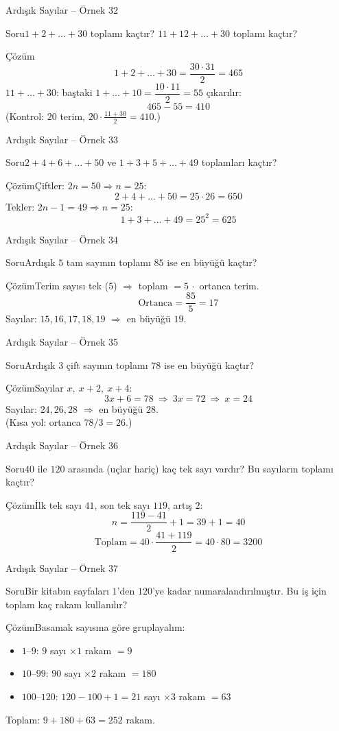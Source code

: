 \documentclass[aspectratio=169,11pt]{beamer}
\newcommand{\soru}[3]{%
\begin{frame}{#1}
  \begin{block}{Soru}\large #2\end{block}
  \pause
  \begin{exampleblock}{Çözüm}\large #3\end{exampleblock}
\end{frame}}
\begin{document}
\soru{Ardışık Sayılar -- Örnek 32}
{\(1+2+\dots+30\) toplamı kaçtır? \(11+12+\dots+30\) toplamı kaçtır?}
{\[1+2+\dots+30=\frac{30\cdot 31}{2}=465\]
\(11+\dots+30\): baştaki \(1+\dots+10=\dfrac{10\cdot 11}{2}=55\) çıkarılır:
\[465-55=410\]
(Kontrol: \(20\) terim, \(20\cdot\frac{11+30}{2}=410\).)}

\soru{Ardışık Sayılar -- Örnek 33}
{\(2+4+6+\dots+50\) ve \(1+3+5+\dots+49\) toplamları kaçtır?}
{Çiftler: \(2n=50\Rightarrow n=25\):
\[2+4+\dots+50=25\cdot 26=650\]
Tekler: \(2n-1=49\Rightarrow n=25\):
\[1+3+\dots+49=25^2=625\]}

\soru{Ardışık Sayılar -- Örnek 34}
{Ardışık \(5\) tam sayının toplamı \(85\) ise en büyüğü kaçtır?}
{Terim sayısı tek (\(5\)) \(\Rightarrow\) toplam \(=5\,\cdot\) ortanca terim.
\[\text{Ortanca}=\frac{85}{5}=17\]
Sayılar: \(15,16,17,18,19\) \(\Rightarrow\) en büyüğü \(19\).}

\soru{Ardışık Sayılar -- Örnek 35}
{Ardışık \(3\) çift sayının toplamı \(78\) ise en büyüğü kaçtır?}
{Sayılar \(x,\ x+2,\ x+4\):
\[3x+6=78\ \Rightarrow\ 3x=72\ \Rightarrow\ x=24\]
Sayılar: \(24,26,28\) \(\Rightarrow\) en büyüğü \(28\).\\[3pt]
(Kısa yol: ortanca \(78/3=26\).)}

\soru{Ardışık Sayılar -- Örnek 36}
{\(40\) ile \(120\) arasında (uçlar hariç) kaç tek sayı vardır? Bu sayıların toplamı kaçtır?}
{İlk tek sayı \(41\), son tek sayı \(119\), artış \(2\):
\[n=\frac{119-41}{2}+1=39+1=40\]
\[\text{Toplam}=40\cdot\frac{41+119}{2}=40\cdot 80=3200\]}

\soru{Ardışık Sayılar -- Örnek 37}
{Bir kitabın sayfaları \(1\)'den \(120\)'ye kadar numaralandırılmıştır. Bu iş için toplam kaç rakam kullanılır?}
{Basamak sayısına göre gruplayalım:
\begin{itemize}
\item \(1\)--\(9\): \(9\) sayı \(\times 1\) rakam \(=9\)
\item \(10\)--\(99\): \(90\) sayı \(\times 2\) rakam \(=180\)
\item \(100\)--\(120\): \(120-100+1=21\) sayı \(\times 3\) rakam \(=63\)
\end{itemize}
Toplam: \(9+180+63=252\) rakam.}
\end{document}
